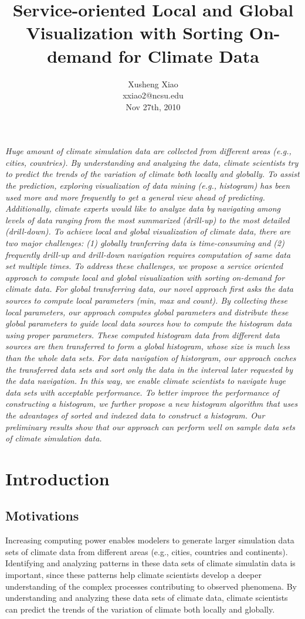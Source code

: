 \documentclass[times, 10pt,onecolumn]{article} %
\title{Service-oriented Local and Global Visualization with Sorting On-demand for Climate Data}
\author{
Xusheng Xiao\\
\small{xxiao2@ncsu.edu}\\
\small{Nov 27th, 2010}
}
\begin{document}
\maketitle
\abstract
\textit{Huge amount of climate simulation data are collected from different areas (e.g., cities, countries). By understanding and analyzing the data, climate scientists try to predict the trends of the variation of climate both locally and globally. To assist the prediction, exploring visualization of data mining (e.g., histogram) has been used more and more frequently to get a general view ahead of predicting. Additionally, climate experts would like to analyze data by navigating among levels of data ranging from the most summarized (drill-up) to the most detailed (drill-down). To achieve local and global visualization of climate data, there are two major challenges: (1) globally tranferring data is time-consuming and (2) frequently drill-up and drill-down navigation requires computation of same data set multiple times. To address these challenges, we propose a service oriented approach to compute local and global visualization with sorting on-demand for climate data. For global transferring data, our novel approach first asks the data sources to compute local parameters (min, max and count). By collecting these local parameters, our approach computes global parameters and distribute these global parameters to guide local data sources how to compute the histogram data using proper parameters. These computed histogram data from different data sources are then transferred to form a global histogram, whose size is much less than the whole data sets. For data navigation of historgram, our approach caches the transferred data sets and sort only the data in the interval later requested by the data navigation. In this way, we enable climate scientists to navigate huge data sets with acceptable performance. To better improve the performance of constructing a histogram, we further propose a new histogram algorithm that uses the advantages of sorted and indexed data to construct a histogram. Our preliminary results show that our approach can perform well on sample data sets of climate simulation data.  
}\endabstract

\section{Introduction}
\subsection{Motivations} 
Increasing computing power enables modelers to generate larger simulation data sets of climate data from different areas (e.g., cities, countries and continents). Identifying and analyzing patterns in these data sets of climate simulatin data is important, since these patterns help climate scientists develop a deeper understanding of the complex processes contributing to observed phenomena. By understanding and analyzing these data sets of climate data, climate scientists can predict the trends of the variation of climate both locally and globally. 
\end{document}
